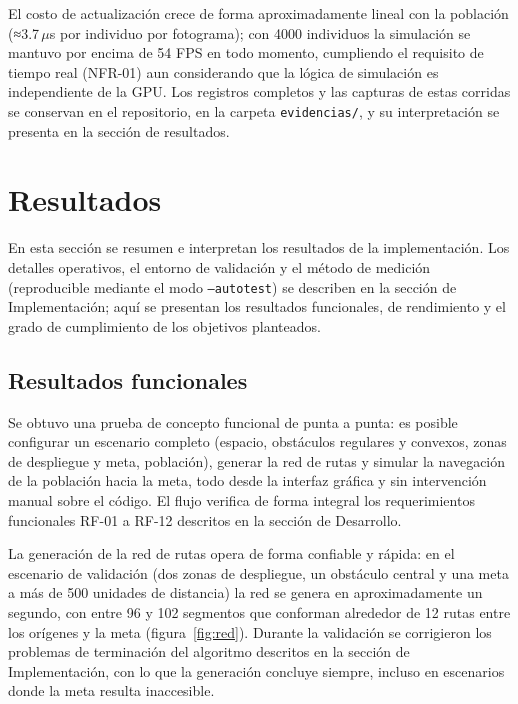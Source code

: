 \documentclass[12pt,a4paper]{article}
\begin{document}
El costo de actualización crece de forma aproximadamente lineal con la población (≈3.7\,$\mu$s por individuo por fotograma); con 4000 individuos la simulación se mantuvo por encima de 54 FPS en todo momento, cumpliendo el requisito de tiempo real (NFR-01) aun considerando que la lógica de simulación es independiente de la GPU. Los registros completos y las capturas de estas corridas se conservan en el repositorio, en la carpeta \texttt{evidencias/}, y su interpretación se presenta en la sección de resultados.


\section{Resultados}

En esta sección se resumen e interpretan los resultados de la implementación. Los detalles operativos, el entorno de validación y el método de medición (reproducible mediante el modo \texttt{--autotest}) se describen en la sección de Implementación; aquí se presentan los resultados funcionales, de rendimiento y el grado de cumplimiento de los objetivos planteados.

\subsection{Resultados funcionales}

Se obtuvo una prueba de concepto funcional de punta a punta: es posible configurar un escenario completo (espacio, obstáculos regulares y convexos, zonas de despliegue y meta, población), generar la red de rutas y simular la navegación de la población hacia la meta, todo desde la interfaz gráfica y sin intervención manual sobre el código. El flujo verifica de forma integral los requerimientos funcionales RF-01 a RF-12 descritos en la sección de Desarrollo.

La generación de la red de rutas opera de forma confiable y rápida: en el escenario de validación (dos zonas de despliegue, un obstáculo central y una meta a más de 500 unidades de distancia) la red se genera en aproximadamente un segundo, con entre 96 y 102 segmentos que conforman alrededor de 12 rutas entre los orígenes y la meta (figura~\ref{fig:red}). Durante la validación se corrigieron los problemas de terminación del algoritmo descritos en la sección de Implementación, con lo que la generación concluye siempre, incluso en escenarios donde la meta resulta inaccesible.
\end{document}
